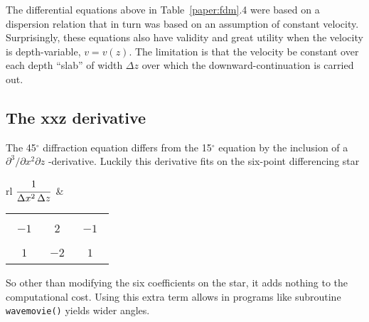 \par
The differential equations above
in Table~\ref{paper:fdm}.4
were based on a dispersion relation
that in turn was based on an assumption of constant velocity.
Surprisingly, these equations also have validity and great utility
when the velocity is depth-variable,  $v = v(z)$.
The limitation is that the velocity be constant over each 
depth ``slab'' of width $\Delta z$ over which the downward-continuation
is carried out.


\subsection{The xxz derivative}
\par
The 45$^\circ$ diffraction equation differs from the 15$^\circ$ equation
by the inclusion of a  $ \partial^3 / \partial x^2 \partial z $ -derivative.
Luckily this derivative fits on the six-point differencing star
\begin{center}
\begin{tabular}{rl}
$\displaystyle {\strut 1\over\Delta x^2\,\Delta z}$ &
  \begin{tabular}{|c|c|c|} \hline
 & &  \\   \ $-1$\ & \ 2\  &\ $-1$\ \\  & &  \\  \hline
 & &  \\     $ 1$  & $-2$  &  $ 1$  \\  & &  \\  \hline
  \end{tabular}
\end{tabular}
\end{center}
So other than modifying the six coefficients on the star,
it adds nothing to the computational cost.
Using this extra term allows in programs like
subroutine \texttt{wavemovie()}  yields wider angles.

\par
{}
%

